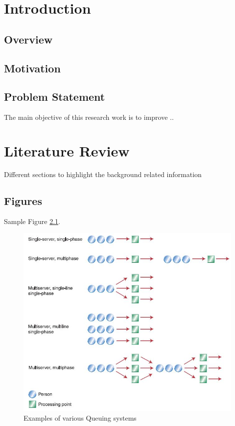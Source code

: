 \documentclass[12pt,a4paper]{report}
\begin{document}
\newpage
\listoffigures

\newpage
\setcounter{page}{1}
\pagestyle{plain}

\pagebreak

\chapter{Introduction}

\section{Overview}
\clearpage
\section{Motivation}

\clearpage

\section{Problem Statement}
The main objective of this research work is to improve ..

\chapter{Literature Review}
Different sections to highlight the background related information
\section{Figures}
Sample Figure \ref{fig1}.
\begin{figure}[h!]
	\begin{center}
		\includegraphics[scale=0.6]{servers.JPG}
		\caption{Examples of various Queuing systems}
		\label{fig1}
	\end{center}
\end{figure}
\end{document}
